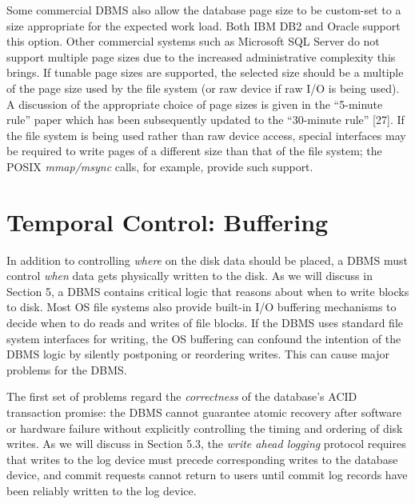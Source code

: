 \documentclass[b5paper,11pt,twoside,openright]{book}
\begin{document}
Some commercial DBMS also allow the database page size to be custom-set
to a size appropriate for the expected work load. Both IBM DB2 and
Oracle support this option. Other commercial systems such as Microsoft
SQL Server do not support multiple page sizes due to the increased
administrative complexity this brings. If tunable page sizes are
supported, the selected size should be a multiple of the page size used
by the file system (or raw device if raw I/O is being used). A
discussion of the appropriate choice of page sizes is given in the
``5-minute rule'' paper which has been subsequently updated to the
``30-minute rule'' {[}27{]}. If the file system is being used rather
than raw device access, special interfaces may be required to write
pages of a different size than that of the file system; the POSIX
\emph{mmap/msync} calls, for example, provide such support.

\hypertarget{temporal-control-buffering}{%
\section{Temporal Control:
Buffering}\label{temporal-control-buffering}}

In addition to controlling \emph{where} on the disk data should be
placed, a DBMS must control \emph{when} data gets physically written to
the disk. As we will discuss in Section 5, a DBMS contains critical
logic that reasons about when to write blocks to disk. Most OS file
systems also provide built-in I/O buffering mechanisms to decide when to
do reads and writes of file blocks. If the DBMS uses standard file
system interfaces for writing, the OS buffering can confound the
intention of the DBMS logic by silently postponing or reordering writes.
This can cause major problems for the DBMS.

The first set of problems regard the \emph{correctness} of the
database's ACID transaction promise: the DBMS cannot guarantee atomic
recovery after software or hardware failure without explicitly
controlling the timing and ordering of disk writes. As we will discuss
in Section 5.3, the \emph{write ahead logging} protocol requires that
writes to the log device must precede corresponding writes to the
database device, and commit requests cannot return to users until commit
log records have been reliably written to the log device.
\end{document}
